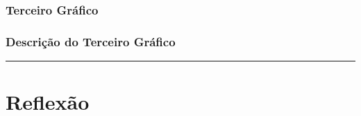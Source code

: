 \documentclass[]{article}
\begin{document}
\hypertarget{terceiro-grafico}{%
\subsubsection{Terceiro Gráfico}\label{terceiro-grafico}}

\hypertarget{descricao-do-terceiro-grafico}{%
\subsubsection{Descrição do Terceiro
Gráfico}\label{descricao-do-terceiro-grafico}}

\begin{center}\rule{0.5\linewidth}{\linethickness}\end{center}

\hypertarget{reflexao}{%
\section{Reflexão}\label{reflexao}}
\end{document}
